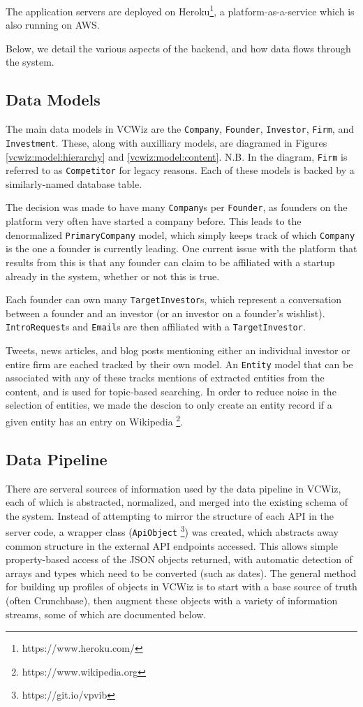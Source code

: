 The application servers are deployed on Heroku\footnote{https://www.heroku.com/}, a platform-as-a-service which is also running on AWS.

Below, we detail the various aspects of the backend, and how data flows through the system.

\subsection{Data Models}

The main data models in VCWiz are the \texttt{Company}, \texttt{Founder}, \texttt{Investor}, \texttt{Firm}, and \texttt{Investment}. These, along with auxilliary models, are diagramed in Figures \ref{vcwiz:model:hierarchy} and \ref{vcwiz:model:content}. N.B. In the diagram, \texttt{Firm} is referred to as \texttt{Competitor} for legacy reasons. Each of these models is backed by a similarly-named database table.

The decision was made to have many \texttt{Company}s per \texttt{Founder}, as founders on the platform very often have started a company before. This leads to the denormalized \texttt{PrimaryCompany} model, which simply keeps track of which \texttt{Company} is the one a founder is currently leading. One current issue with the platform that results from this is that any founder can claim to be affiliated with a startup already in the system, whether or not this is true.

Each founder can own many \texttt{TargetInvestor}s, which represent a conversation between a founder and an investor (or an investor on a founder's wishlist). \texttt{IntroRequest}s and \texttt{Email}s are then affiliated with a \texttt{TargetInvestor}.

Tweets, news articles, and blog posts mentioning either an individual investor or entire firm are eached tracked by their own model. An \texttt{Entity} model that can be associated with any of these tracks mentions of extracted entities from the content, and is used for topic-based searching. In order to reduce noise in the selection of entities, we made the descion to only create an entity record if a given entity has an entry on Wikipedia \footnote{https://www.wikipedia.org}.

\subsection{Data Pipeline}

There are serveral sources of information used by the data pipeline in VCWiz, each of which is abstracted, normalized, and merged into the existing schema of the system.  Instead of attempting to mirror the structure of each API in the server code, a wrapper class (\texttt{ApiObject} \footnote{https://git.io/vpvib}) was created, which abstracts away common structure in the external API endpoints accessed. This allows simple property-based access of the JSON objects returned, with automatic detection of arrays and types which need to be converted (such as dates). The general method for building up profiles of objects in VCWiz is to start with a base source of truth (often Crunchbase), then augment these objects with a variety of information streams, some of which are documented below.

